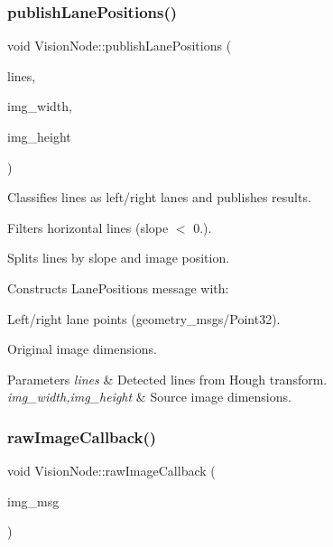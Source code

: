 \subsubsection{\texorpdfstring{publish\+Lane\+Positions()}{publishLanePositions()}}
{\footnotesize\ttfamily void Vision\+Node\+::publish\+Lane\+Positions (\begin{DoxyParamCaption}\item[{std\+::vector$<$ cv\+::\+Vec4i $>$ \&}]{lines,  }\item[{int}]{img\+\_\+width,  }\item[{int}]{img\+\_\+height }\end{DoxyParamCaption})\hspace{0.3cm}{\ttfamily [private]}}



Classifies lines as left/right lanes and publishes results. 


\begin{DoxyItemize}
\item Filters horizontal lines (slope $<$ 0.).
\item Splits lines by slope and image position.
\item Constructs Lane\+Positions message with\+:
\begin{DoxyItemize}
\item Left/right lane points (geometry\+\_\+msgs/\+Point32).
\item Original image dimensions.
\end{DoxyItemize}
\end{DoxyItemize}


\begin{DoxyParams}{Parameters}
{\em lines} & Detected lines from Hough transform. \\
\hline
{\em img\+\_\+width,img\+\_\+height} & Source image dimensions. \\
\hline
\end{DoxyParams}
\mbox{\label{classVisionNode_aabbd33da50754623d30ba7c8c41dc2bc}} 
\subsubsection{\texorpdfstring{raw\+Image\+Callback()}{rawImageCallback()}}
{\footnotesize\ttfamily void Vision\+Node\+::raw\+Image\+Callback (\begin{DoxyParamCaption}\item[{sensor\+\_\+msgs\+::msg\+::\+Image\+::\+Shared\+Ptr}]{img\+\_\+msg }\end{DoxyParamCaption})\hspace{0.3cm}{\ttfamily [private]}}




